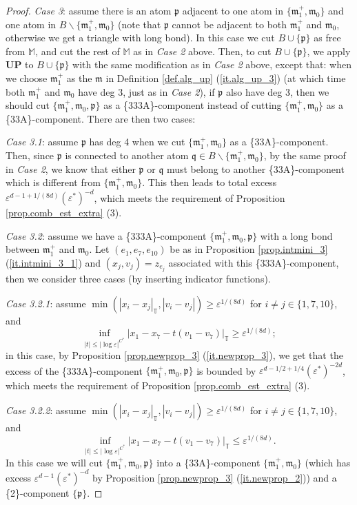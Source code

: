 \documentclass[10pt, reqno]{amsart}
\newcommand{\Mb}{\mathbb M}
\newcommand{\Tb}{\mathbb T}
\newcommand{\mf}{\mathfrak m}
\newcommand{\pf}{\mathfrak p}
\newcommand{\qf}{\mathfrak q}
\theoremstyle{definition}
\theoremstyle{remark}
\numberwithin{equation}{section}
\begin{document}
\begin{proof}
\emph{Case 3}: assume there is an atom $\pf$ adjacent to one atom in $\{\mf_1^+,\mf_0\}$ and one atom in $B\backslash\{\mf_1^+,\mf_0\}$ (note that $\pf$ cannot be adjacent to both $\mf_1^+$ and $\mf_0$, otherwise we get a triangle with long bond). In this case we cut $B\cup\{\pf\}$ as free from $\Mb$, and cut the rest of $\Mb$ as in \emph{Case 2} above. Then, to cut $B\cup\{\pf\}$, we apply \textbf{UP} to $B\cup\{\pf\}$ with the same modification as in \emph{Case 2} above, except that: when we choose $\mf_1^+$ as the $\mf$ in Definition \ref{def.alg_up} (\ref{it.alg_up_3}) (at which time both $\mf_1^+$ and $\mf_0$ have deg 3, just as in \emph{Case 2}), if $\pf$ also have deg 3, then we should cut $\{\mf_1^+,\mf_0,\pf\}$ as a \{333A\}-component instead of cutting $\{\mf_1^+,\mf_0\}$ as a \{33A\}-component. There are then two cases:

\emph{Case 3.1}: assume $\pf$ has deg 4 when we cut $\{\mf_1^+,\mf_0\}$ as a \{33A\}-component. Then, since $\pf$ is connected to another atom $\qf\in B\backslash\{\mf_1^+,\mf_0\}$, by the same proof in \emph{Case 2}, we know that either $\pf$ or $\qf$ must belong to another \{33A\}-component which is different from $\{\mf_1^+,\mf_0\}$. This then leads to total excess $\varepsilon^{d-1+1/(8d)}(\varepsilon^*)^{-d}$, which meets the requirement of Proposition \ref{prop.comb_est_extra} (3).

\emph{Case 3.2}: assume we have a \{333A\}-component $\{\mf_1^+,\mf_0,\pf\}$ with a long bond between $\mf_1^+$ and $\mf_0$. Let $(e_1,e_7,e_{10})$ be as in Proposition \ref{prop.intmini_3} (\ref{it.intmini_3_1}) and $(x_j,v_j)=z_{e_j}$ associated with this \{333A\}-component, then we consider three cases (by inserting indicator functions).

\emph{Case 3.2.1}: assume $\min(|x_i-x_j|_\Tb,|v_i-v_j|)\geq \varepsilon^{1/(8d)}$ for $i\neq j\in\{1,7,10\}$, and
\begin{equation}\label{eq.newprop_3_2_cite}\inf_{|t|\leq|\log\varepsilon|^{C^*}}|x_1-x_7-t(v_1-v_7)|_\Tb\geq\varepsilon^{1/(8d)};\end{equation} in this case, by Proposition \ref{prop.newprop_3} (\ref{it.newprop_3}), we get that the excess of the \{333A\}-component $\{\mf_1^+,\mf_0,\pf\}$ is bounded by $\varepsilon^{d-1/2+1/4}(\varepsilon^*)^{-2d}$, which meets the requirement of Proposition \ref{prop.comb_est_extra} (3).

\emph{Case 3.2.2}: assume $\min(|x_i-x_j|_\Tb,|v_i-v_j|)\geq \varepsilon^{1/(8d)}$ for $i\neq j\in\{1,7,10\}$, and
\begin{equation}\label{eq.newprop_3_2_cite_2}\inf_{|t|\leq|\log\varepsilon|^{C^*}}|x_1-x_7-t(v_1-v_7)|_\Tb\leq\varepsilon^{1/(8d)}.\end{equation} In this case we will cut $\{\mf_1^+,\mf_0,\pf\}$ into a \{33A\}-component $\{\mf_1^+,\mf_0\}$ (which has excess $\varepsilon^{d-1}(\varepsilon^*)^{-d}$ by Proposition \ref{prop.newprop_3} (\ref{it.newprop_2})) and a \{2\}-component $\{\pf\}$. 


\end{proof}
\end{document}
